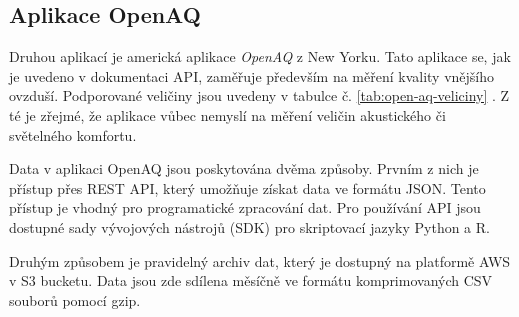 \FloatBarrier
\subsection{Aplikace OpenAQ}

Druhou aplikací je americká aplikace \textit{OpenAQ} z New Yorku. Tato aplikace se, jak je uvedeno v dokumentaci API, zaměřuje především na měření kvality vnějšího ovzduší. Podporované veličiny jsou uvedeny v tabulce č. \ref{tab:open-aq-veliciny} \parencite{API}. Z té je zřejmé, že aplikace vůbec nemyslí na měření veličin akustického či světelného komfortu. 

Data v aplikaci OpenAQ jsou poskytována dvěma způsoby. 
Prvním z nich je přístup přes REST API, který umožňuje získat data ve formátu JSON. Tento přístup je vhodný pro programatické zpracování dat. Pro používání API jsou dostupné sady vývojových nástrojů (SDK) pro skriptovací jazyky Python a R. \parencite{API}  

Druhým způsobem je pravidelný archiv dat, který je dostupný na platformě AWS v S3 bucketu. Data jsou zde sdílena měsíčně ve formátu komprimovaných CSV souborů pomocí gzip. \parencite{zotero-item-552}

